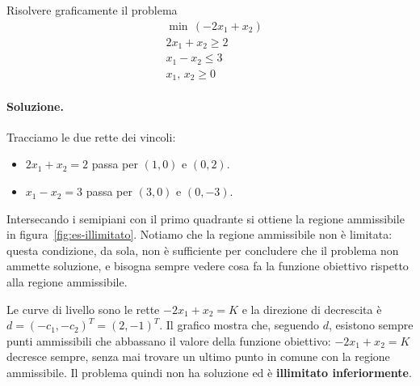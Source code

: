 \begin{esercizio}
Risolvere graficamente il problema
\[
\begin{aligned}
&\min\, (-2x_1 + x_2) \\
&2x_1 + x_2 \ge 2 \\
&x_1 - x_2 \le 3 \\
&x_1,\, x_2 \ge 0
\end{aligned}
\]
\end{esercizio}

\paragraph{Soluzione.}
Tracciamo le due rette dei vincoli:
\begin{itemize}
    \item $2x_1 + x_2 = 2$ passa per $(1, 0)$ e $(0, 2)$.
    \item $x_1 - x_2 = 3$ passa per $(3, 0)$ e $(0, -3)$.
\end{itemize}
Intersecando i semipiani con il primo quadrante si ottiene la regione ammissibile in figura~\ref{fig:es-illimitato}. Notiamo che la regione ammissibile non è limitata: questa condizione, da sola, non è sufficiente per concludere che il problema non ammette soluzione, e bisogna sempre vedere cosa fa la funzione obiettivo rispetto alla regione ammissibile.

Le curve di livello sono le rette $-2x_1 + x_2 = K$ e la direzione di decrescita è $d = (-c_1, -c_2)^T = (2, -1)^T$. Il grafico mostra che, seguendo $d$, esistono sempre punti ammissibili che abbassano il valore della funzione obiettivo: $-2x_1 + x_2 = K$ decresce sempre, senza mai trovare un ultimo punto in comune con la regione ammissibile. Il problema quindi non ha soluzione ed è \textbf{illimitato inferiormente}.

